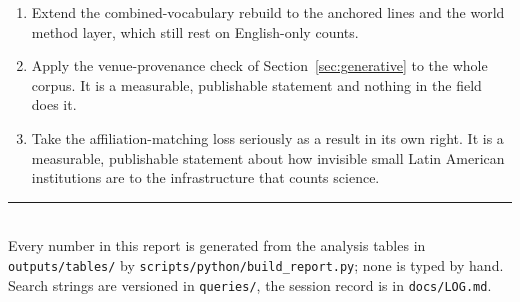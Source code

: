 \documentclass[11pt,a4paper]{article}
\begin{document}
\begin{enumerate}
\item Extend the combined-vocabulary rebuild to the anchored lines and the world method
      layer, which still rest on English-only counts.
\item Apply the venue-provenance check of Section~\ref{sec:generative} to the whole
      corpus. It is a measurable, publishable statement and nothing in the field does it.
\item Take the affiliation-matching loss seriously as a result in its own right. It is a
      measurable, publishable statement about how invisible small Latin American
      institutions are to the infrastructure that counts science.
\end{enumerate}

\vfill
\noindent\rule{\textwidth}{0.4pt}\\
\footnotesize
Every number in this report is generated from the analysis tables in
\texttt{outputs/tables/} by \texttt{scripts/python/build\_report.py}; none is typed by hand.
Search strings are versioned in \texttt{queries/}, the session record is in
\texttt{docs/LOG.md}.
\end{document}
